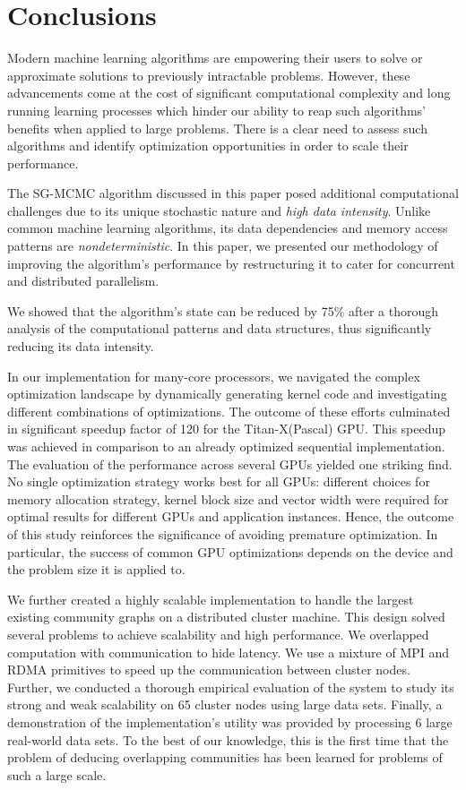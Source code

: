 \section{Conclusions}
\label{sec-conclusion}

Modern machine learning algorithms are empowering their
users to solve or approximate solutions to previously intractable problems.
However, these advancements come at the cost of significant computational
complexity and long running learning processes which hinder our ability to reap
such algorithms' benefits when applied to large problems. There is a clear need
to assess such algorithms and identify optimization opportunities in order to
scale their performance.

The SG-MCMC algorithm discussed in this paper posed additional computational
challenges due to its unique stochastic nature and \emph{high data intensity}. Unlike
common machine learning algorithms, its data dependencies and memory access
patterns are \emph{nondeterministic}. In this paper, we presented our methodology of
improving the algorithm's performance by restructuring it to
cater for concurrent and distributed parallelism.

We showed that the algorithm's state can be reduced by 75\% after a thorough
analysis of the computational patterns and data structures, thus significantly
reducing its data intensity.

In our implementation for many-core processors, we navigated the complex optimization
landscape by dynamically generating kernel code and investigating different
combinations of optimizations. The outcome of these efforts culminated in
significant speedup factor of 120 for the \mbox{Titan-X(Pascal)} GPU.
This speedup was achieved in comparison to an already
optimized sequential implementation. The evaluation of the performance
across several GPUs yielded one striking find. No single optimization strategy
works best for all GPUs: different choices for memory allocation strategy,
kernel block size and vector width were required for optimal results for
different GPUs and application instances.
%
Hence, the outcome of this study reinforces the significance of avoiding premature
optimization. In particular, the success
of common GPU optimizations depends on the device and the
problem size it is applied to.

We further created a highly scalable implementation to handle the largest existing
community graphs on a distributed cluster machine.
This design solved
several problems to achieve scalability and high performance.
We overlapped computation
with communication to hide latency.  We use a
mixture of MPI and RDMA primitives to speed up the communication between cluster
nodes.
%
Further, we conducted a thorough empirical evaluation of the system to study its strong
and weak scalability on 65 cluster nodes using large data sets.
Finally, a
demonstration of the implementation's utility was provided by processing 6
large real-world data sets.
To the best of
our knowledge, this is the first time that the problem of deducing overlapping
communities has been learned for problems of such a large scale.
